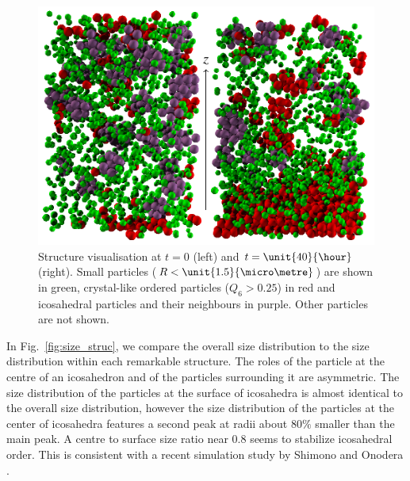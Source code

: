 \documentclass[8.5pt,twoside,twocolumn]{article}
\begin{document}
\begin{figure}[h]
	\centering
	\includegraphics{fig_mrco_ico_small.pdf}
	\caption{Structure visualisation at $t=0$ (left) and $t=\unit{40}{\hour}$ (right). Small particles ($R<\unit{1.5}{\micro\metre}$) are shown in green, crystal-like ordered particles ($Q_6>0.25$) in red and icosahedral particles and their neighbours in purple. Other particles are not shown.}
	\label{fig:mrco_ico_small}
\end{figure}




In Fig.~\ref{fig:size_struc}, we compare the overall size distribution to the size distribution within each remarkable structure. The roles of the particle at the centre of an icosahedron and of the particles surrounding it are asymmetric. The size distribution of the particles at the surface of icosahedra is almost identical to the overall size distribution, however the size distribution of the particles at the center of icosahedra features a second peak at radii about $80\%$ smaller than the main peak. A centre to surface size ratio near $0.8$ seems to stabilize icosahedral order. This is consistent with a recent simulation study by Shimono and Onodera \cite{shimono2012icosahedral}.  
\end{document}
